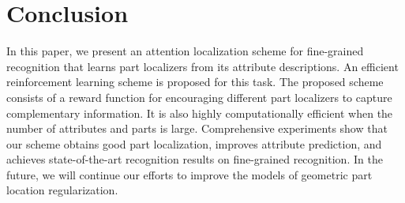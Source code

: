 \documentclass{article}
\begin{document}
\section{Conclusion}
In this paper, we present an attention localization scheme for fine-grained recognition that learns part localizers from its attribute descriptions.
An efficient reinforcement learning scheme is proposed for this task.
The proposed scheme consists of a reward function for encouraging different part localizers to capture complementary information.
It is also highly computationally efficient when the number of attributes and parts is large.
Comprehensive experiments show that our scheme obtains good part localization, improves attribute prediction, and achieves state-of-the-art recognition results on fine-grained recognition.
In the future, we will continue our efforts to improve the models of geometric part location regularization.


\medskip

\small



\end{document}
